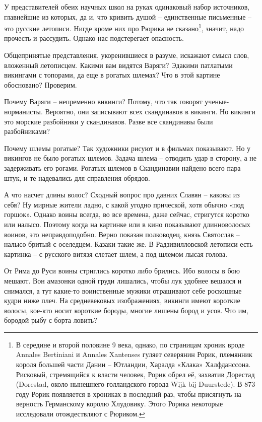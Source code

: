 У представителей обеих научных школ на руках одинаковый набор источников, главнейшие из которых, да и, что кривить душой – единственные письменные – это русские летописи. Нигде кроме них про Рюрика не сказано\footnote{В середине и второй половине 9 века, однако, по страницам хроник вроде Annales Bertiniani и Annales Xantenses гуляет северянин Рорик, племянник короля большей части Дании – Ютландии, Харалда «Клака» Халфданссона. Рисковый, стремящийся к власти человек, Рорик обрел её, захватив Дорестад (Dorestad, около нынешнего голландского города Wijk bij Duurstede). В 873 году Рорик появляется в хрониках в последний раз, чтобы присягнуть на верность Германскому королю Хлудовику. Этого Рорика некоторые исследовали отождествляют с Рюриком.}, значит, надо прочесть и рассудить. Однако нас подстерегает опасность.

Общепринятые представления, укоренившиеся в разуме, искажают смысл слов, вложенный летописцем. Какими вам видятся Варяги? Эдакими патлатыми викингами с топорами, да еще в рогатых шлемах? Что в этой картине обосновано? Проверим.

Почему Варяги – непременно викинги? Потому, что так говорят ученые-норманисты. Вероятно, они записывают всех скандинавов в викинги. Но викинги это морские разбойники у скандинавов. Разве все скандинавы были разбойниками?

Почему шлемы рогатые? Так художники рисуют и в фильмах показывают. Но у викингов не было рогатых шлемов. Задача шлема – отводить удар в сторону, а не задерживать его рогами. Рогатых шлемов в Скандинавии найдено всего пара штук, и те надевались для справления обрядов.

А что насчет длины волос? Сходный вопрос про давних Славян – каковы из себя? Ну мирные жители ладно, с какой угодно прической, хотя обычно «под горшок». Однако воины всегда, во все времена, даже сейчас, стригутся коротко или налысо. Поэтому когда на картинке или в кино показывают длинноволосых воинов, это неправдоподобно. Верно показан полководец, князь Святослав – налысо бритый с оселедцем. Казаки такие же. В Радзивилловской летописи есть картинка – с русского витязя слетает шлем, а под шлемом лысая голова. 

От Рима до Руси воины стриглись коротко либо брились. Ибо волосы в бою мешают. Вон амазонки одной груди лишались, чтобы лук удобнее вешался и снимался, а тут какие-то воинственные мужики отращивают себе роскошные кудри ниже плеч. На средневековых изображениях, викинги имеют короткие волосы, кое-кто носит короткие бороды, многие лишены бород и усов. Что им, бородой рыбу с борта ловить?

